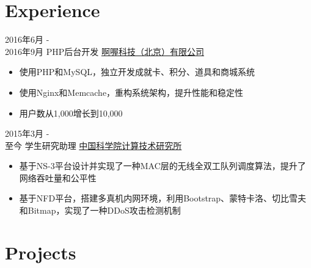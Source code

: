 \documentclass[letterpaper]{twentysecondcv} %
\begin{document}
\makeprofile %



\section{Experience}

\begin{twenty} %
	\twentyitem
    	{2016年6月 - \\2016年9月}
        {PHP后台开发}
        {\href{http://www.runorout.cn/}{啊喔科技（北京）有限公司}}
        {}
        {
        {\begin{itemize}
        \item 使用PHP和MySQL，独立开发成就卡、积分、道具和商城系统
        \item 使用Nginx和Memcache，重构系统架构，提升性能和稳定性
        \item 用户数从1,000增长到10,000
    \end{itemize}}
        }
    
    \twentyitem
	    {2015年3月 - \\至今}
	    {学生研究助理}
	    {\href{http://english.ict.cas.cn/}{中国科学院计算技术研究所}}
	    {}
	    {
    	{\begin{itemize}
    			\item 基于NS-3平台设计并实现了一种MAC层的无线全双工队列调度算法，提升了网络吞吐量和公平性
    			\item 基于NFD平台，搭建多真机内网环境，利用Bootstrap、蒙特卡洛、切比雪夫和Bitmap，实现了一种DDoS攻击检测机制
    	\end{itemize}}
    }
        
\end{twenty}


\section{Projects}
\end{document}
